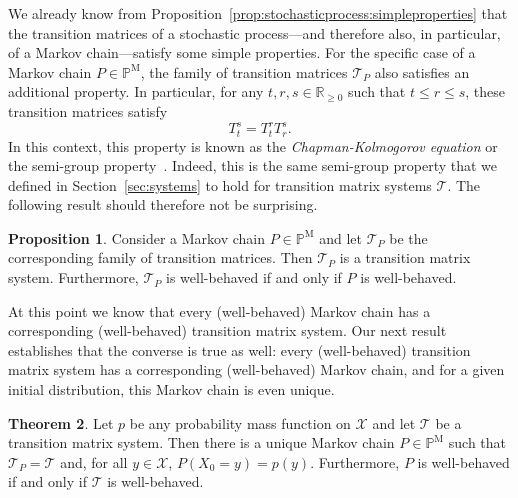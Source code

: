 \documentclass[10pt,a4paper]{paper}
\theoremstyle{definition}
\newtheorem{theorem}{Theorem}[section]
\newtheorem{proposition}[theorem]{Proposition}
\newcommand{\reals}{\mathbb{R}}
\newcommand{\realsnonneg}{\reals_{\geq 0}}
\newcommand{\states}{\mathcal{X}}
\newcommand{\processes}{\mathbb{P}}
\newcommand{\mprocesses}{\processes^{\mathrm{M}}}
\begin{document}

We already know from Proposition~\ref{prop:stochasticprocess:simpleproperties} that the transition matrices of a stochastic process---and therefore also, in particular, of a Markov chain---satisfy some simple properties. For the specific case of a Markov chain $P\in\mprocesses$, the family of transition matrices $\mathcal{T}_P$ also satisfies an additional property. In particular, for any $t,r,s\in\realsnonneg$ such that $t\leq r\leq s$, these transition matrices satisfy
\begin{equation}\label{eq:markovintermsofmatrices}
T_t^s = T_t^rT_r^s.
\end{equation}
In this context, this property is known as the \emph{Chapman-Kolmogorov equation} or the semi-group property~\cite{liggett2010continuous}. Indeed, this is the same semi-group property that we defined in Section~\ref{sec:systems} to hold for transition matrix systems $\mathcal{T}$. The following result should therefore not be surprising.

\begin{proposition}\label{prop:Markovhassystem}
Consider a Markov chain $P\in\mprocesses$ and let $\mathcal{T}_P$ be the corresponding family of transition matrices. Then $\mathcal{T}_P$ is a transition matrix system. Furthermore, $\mathcal{T}_P$ is well-behaved if and only if $P$ is well-behaved.
\end{proposition}

At this point we know that every (well-behaved) Markov chain has a corresponding (well-behaved) transition matrix system. Our next result establishes that the converse is true as well: every (well-behaved) transition matrix system has a corresponding (well-behaved) Markov chain, and for a given initial distribution, this Markov chain is even unique.

\begin{theorem}\label{theo:uniqueMarkovchain}
Let $p$ be any probability mass function on $\states$ and let $\mathcal{T}$ be a transition matrix system. Then there is a unique Markov chain $P\in\mprocesses$ such that $\mathcal{T}_P=\mathcal{T}$ and, for all $y\in\states$, $P(X_0=y)=p(y)$. Furthermore, $P$ is well-behaved if and only if $\mathcal{T}$ is well-behaved.
\end{theorem}
\end{document}
